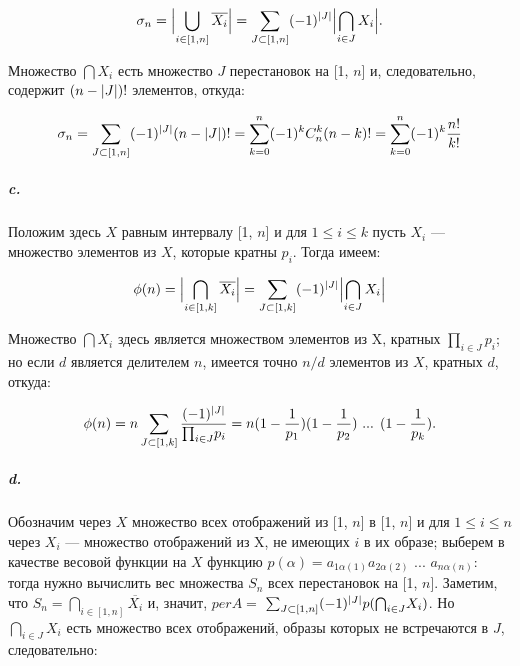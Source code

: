 \documentclass{../../template/mai_book}
\DeclarePairedDelimiter{\abs}{\lvert}{\rvert}
\begin{document}
\begin{equation*}
\sigma_n = \abs[\Big]{\bigcup_{i \in [1, n]} \overline{X_i}} = \sum_{J \subset [1, n]} (-1)^{\abs{J}} \abs[\Big]{\bigcap_{i \in J} X_i}.
\end{equation*}

\noindent
Множество $\bigcap X_i$ есть множество $J$ перестановок на [1, $n$] и, следовательно, содержит $(n - \abs{J})!$ элементов, откуда:

\begin{equation*}
\sigma_n = \sum_{J \subset [1, n]} (-1)^{\abs{J}} (n - \abs{J})! = \sum_{k = 0}^n (-1)^k C_n^k(n - k)! = \sum_{k = 0}^n (-1)^k \frac{n!}{k!}
\end{equation*}

\newpage


\subparagraph{c.} Положим здесь $X$ равным интервалу [1, $n$] и для $1 \leqslant i \leqslant k$ пусть $X_i$ — множество элементов из $X$, которые кратны $p_i$. Тогда имеем:

\begin{equation*}
\phi(n) = \abs[\Big]{\bigcap_{i \in [1, k]} \overline{X_i}} = \sum_{J \subset [1, k]} (-1)^{\abs{J}} \abs[\Big]{\bigcap_{i \in J} X_i}
\end{equation*}

\noindent
Множество $\bigcap X_i$ здесь является множеством элементов из X, кратных ${\prod}_{i \in J} p_i$; но если $d$ является делителем $n$, имеется точно $n / d$ элементов из $X$, кратных $d$, откуда:

\begin{equation*}
\phi(n) = n \sum_{J \subset [1, k]} \frac{(-1)^{\abs{J}}}{{\prod}_{i \in J} p_i} = n (1 - \frac{1}{p_1}) (1 - \frac{1}{p_2}) \text{ ... } (1 - \frac{1}{p_k}).
\end{equation*}

\subparagraph{d.} Обозначим через $X$ множество всех отображений из [1, $n$] в [1, $n$] и для $1 \leqslant i \leqslant n$ через $X_i$ — множество отображений из X, не имеющих $i$ в их образе; выберем в качестве весовой функции на $X$ функцию $p(\alpha) = a_{1\alpha(1)} a_{2\alpha(2)} \text{ ... } a_{n\alpha(n)}$: тогда нужно вычислить вес множества $S_n$ всех перестановок на [1, $n$]. Заметим, что $S_n = {\bigcap}_{i \in [1, n]} \overline{X_i}$ и, значит, $per A =$ \linebreak ${\sum}_{J \subset [1, n]} (-1)^{\abs{J}} p({\bigcap}_{i \in J} X_i)$. Но ${\bigcap}_{i \in J} X_i$ есть множество всех отображений, образы которых не встречаются в $J$, следовательно:
\end{document}
